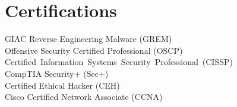 \documentclass[letterpaper,11pt]{article}
\begin{document}
\section{\textbf{Certifications}}
\vspace{-5mm}
\setlength{\columnsep}{50pt}
\begin{multicols}{2}
	\begin{itemize}[noitemsep]
		\small{\item[] {GIAC Reverse Engineering Malware (GREM) \\
			Offensive Security Certified Professional (OSCP) \\
			\mbox{Certified Information Systems Security Professional (CISSP)} \\
			CompTIA Security+ (Sec+) \\
			Certified Ethical Hacker (CEH) \\
			Cisco Certified Network Associate (CCNA)
			}}
	\end{itemize}
\end{multicols}

\end{document}
